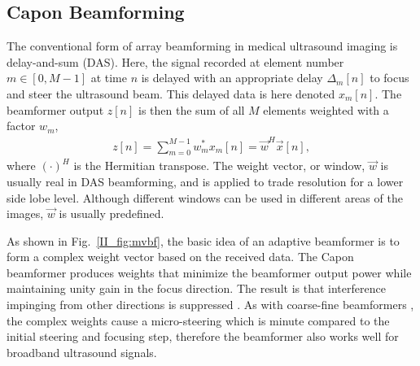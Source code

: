 \subsection{Capon Beamforming}\label{II_sec:es-capon}






The conventional form of array beamforming in medical ultrasound imaging is delay-and-sum (DAS). Here, the signal recorded at element number $m \in [0,M-1]$ at time $n$ is delayed with an appropriate delay $\Delta_m[n]$ to focus and steer the ultrasound beam. This delayed data is here denoted $x_m[n]$. The beamformer output $z[n]$ is then the sum of all $M$ elements weighted with a factor $w_m$,
\begin{align}
z[n] = \sum_{m = 0}^{M-1}w_m^*x_m[n] = \vec{w}^H\vec{x}[n], \label{II_eq:z}
\end{align}
where $(\cdot)^H$ is the Hermitian transpose. The weight vector, or window, $\vec{w}$ is usually real in DAS beamforming, and is applied to trade resolution for a lower side lobe level. Although different windows can be used in different areas of the images, $\vec{w}$ is usually predefined.

As shown in Fig.\ \ref{II_fig:mvbf}, the basic idea of an adaptive beamformer is to form a complex weight vector based on the received data.   The Capon beamformer produces weights that minimize the beamformer output power while maintaining unity gain in the focus direction. The result is that interference impinging from other directions is suppressed \cite{Synnevag2007}. As with coarse-fine beamformers \cite{Thomenius}, the complex weights cause a micro-steering which is minute compared to the initial steering and focusing step, therefore the beamformer also works well for broadband ultrasound signals.

